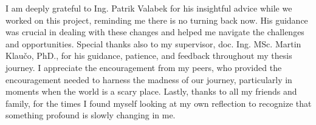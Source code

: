 I am deeply grateful to Ing. Patrik Valabek for his insightful advice while we worked on this project, reminding me there is no turning back now. His guidance was crucial in dealing with these changes and helped me navigate the challenges and opportunities.
Special thanks also to my supervisor, doc. Ing. MSc. Martin Klaučo, PhD., for his guidance, patience, and feedback throughout my thesis journey. 
I appreciate the encouragement from my peers, who provided the encouragement needed to harness the madness of our journey, particularly in moments when the world is a scary place.
Lastly, thanks to all my friends and family, for the times I found myself looking at my own reflection to recognize that something profound is slowly changing in me.